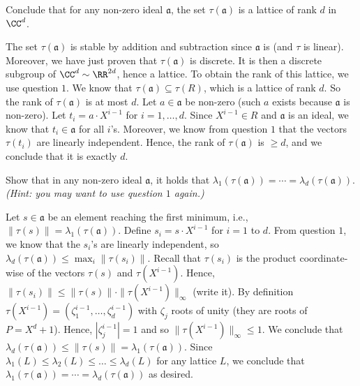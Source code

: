 \documentclass[11pt]{exam}
\theoremstyle{definition}
\begin{document}
\begin{questions}
\question Conclude that for any non-zero ideal $\mathfrak{a}$, the set $\tau(\mathfrak{a})$ is a lattice of rank $d$ in $\CC^d$.

\begin{solution}
The set $\tau(\mathfrak{a})$ is stable by addition and subtraction since $\mathfrak{a}$ is (and $\tau$ is linear). Moreover, we have just proven that $\tau(\mathfrak{a})$ is discrete. It is then a discrete subgroup of $\CC^d \sim \RR^{2d}$, hence a lattice. To obtain the rank of this lattice, we use question $1$. We know that $\tau(\mathfrak{a}) \subseteq \tau(R)$, which is a lattice of rank $d$. So the rank of $\tau(\mathfrak{a})$ is at most $d$.
Let $a \in \mathfrak{a}$ be non-zero (such $a$ exists because $\mathfrak{a}$ is non-zero). Let $t_i = a \cdot X^{i-1}$ for $i = 1, \dots, d$. Since $X^{i-1} \in R$ and $\mathfrak{a}$ is an ideal, we know that $t_i \in \mathfrak{a}$ for all $i$'s. Moreover, we know from question $1$ that the vectors $\tau(t_i)$ are linearly independent. Hence, the rank of $\tau(\mathfrak{a})$ is $\geq d$, and we conclude that it is exactly $d$.
\end{solution}

\question Show that in any non-zero ideal $\mathfrak{a}$, it holds that $\lambda_1(\tau(\mathfrak{a})) = \cdots = \lambda_d(\tau(\mathfrak{a}))$. \\
\textit{\color{gray}(Hint: you may want to use question $1$ again.)}

\begin{solution}
Let $s \in \mathfrak{a}$ be an element reaching the first minimum, i.e., $\|\tau(s)\| = \lambda_1(\tau(\mathfrak{a}))$. Define $s_i = s \cdot X^{i-1}$ for $i = 1$ to $d$. From question $1$, we know that the $s_i$'s are linearly independent, so $\lambda_d(\tau(\mathfrak{a})) \leq \max_i \|\tau(s_i)\|$.
Recall that $\tau(s_i)$ is the product coordinate-wise of the vectors $\tau(s)$ and $\tau(X^{i-1})$. Hence, $\|\tau(s_i)\| \leq \|\tau(s)\| \cdot \|\tau(X^{i-1})\|_\infty$ (write it). By definition $\tau(X^{i-1}) = (\zeta_1^{i-1}, \dots, \zeta_d^{i-1})$ with $\zeta_j$ roots of unity (they are roots of $P = X^d+1$). Hence, $|\zeta_j^{i-1}| = 1$ and so $\|\tau(X^{i-1})\|_\infty \leq 1$. We conclude that $\lambda_d(\tau(\mathfrak{a})) \leq \|\tau(s)\| = \lambda_1(\tau(\mathfrak{a}))$. Since $\lambda_1(L) \leq \lambda_2(L) \leq \dots \leq \lambda_d(L)$ for any lattice $L$, we conclude that $\lambda_1(\tau(\mathfrak{a})) = \cdots = \lambda_d(\tau(\mathfrak{a}))$ as desired.
\end{solution}


\end{questions}
\end{document}
